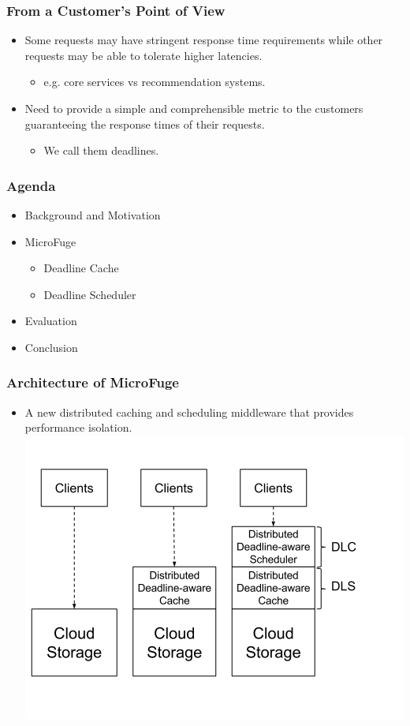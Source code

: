 \documentclass{beamer}
\begin{document}
\begin{frame}
  \frametitle{From a Customer's Point of View}
  \begin{itemize}
  \item Some requests may have stringent response time requirements while other
    requests may be able to tolerate higher latencies.
    \begin{itemize}
    \item e.g. core services vs recommendation systems.
    \end{itemize}
  \item Need to provide a simple and comprehensible metric to the customers
    guaranteeing the response times of their requests.
    \begin{itemize}
    \item We call them deadlines.
    \end{itemize}
  \end{itemize}
\end{frame}

\begin{frame}
  \frametitle{Agenda}
  \begin{itemize}
  \item[\Checkmark] Background and Motivation
  \item MicroFuge
    \begin{itemize}
    \item Deadline Cache
    \item Deadline Scheduler
    \end{itemize}
  \item Evaluation
  \item Conclusion
  \end{itemize}
\end{frame}


\begin{frame}
  \frametitle{Architecture of MicroFuge}
  \begin{itemize}
  \item A new distributed caching and scheduling middleware that provides
    performance isolation.
  \includegraphics[scale=0.28]{img/MF_FULL.png}
  \end{itemize}


\end{frame}
\end{document}
